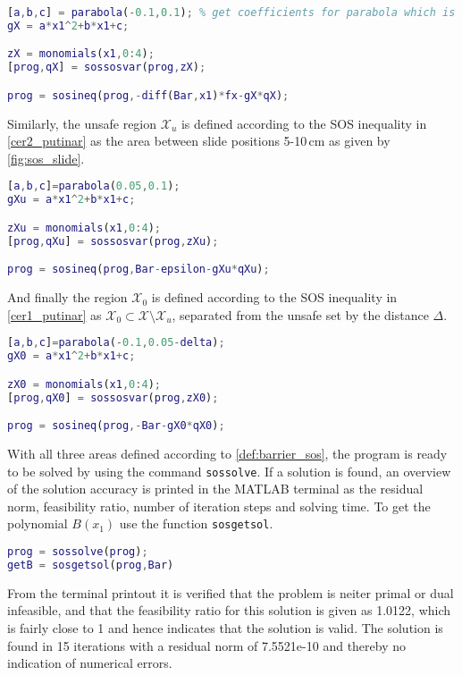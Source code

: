\begin{lstlisting}[language=matlab]
% Define space X in Rn
[a,b,c] = parabola(-0.1,0.1); % get coefficients for parabola which is positive for x in [-0.1,0.1] m
gX = a*x1^2+b*x1+c;

zX = monomials(x1,0:4);
[prog,qX] = sossosvar(prog,zX);

prog = sosineq(prog,-diff(Bar,x1)*fx-gX*qX);
\end{lstlisting}
Similarly, the unsafe region $\mathcal{X}_u$ is defined according to the SOS inequality in \autoref{cer2_putinar} as the area between slide positions 5-10\,cm as given by \autoref{fig:sos_slide}.
\begin{lstlisting}[language=matlab]
% Define space Xu in X
[a,b,c]=parabola(0.05,0.1);
gXu = a*x1^2+b*x1+c;

zXu = monomials(x1,0:4);
[prog,qXu] = sossosvar(prog,zXu);

prog = sosineq(prog,Bar-epsilon-gXu*qXu);
\end{lstlisting}
And finally the region $\mathcal{X}_0$ is defined according to the SOS inequality in \autoref{cer1_putinar} as $\mathcal{X}_0\subset\mathcal{X}\setminus\mathcal{X}_u$, separated from the unsafe set by the distance $\Delta$.
\begin{lstlisting}[language=matlab]
% Define space X0 in X
[a,b,c]=parabola(-0.1,0.05-delta);
gX0 = a*x1^2+b*x1+c;

zX0 = monomials(x1,0:4);
[prog,qX0] = sossosvar(prog,zX0);

prog = sosineq(prog,-Bar-gX0*qX0);
\end{lstlisting}
With all three areas defined according to \autoref{def:barrier_sos}, the program is ready to be solved by using the command \texttt{sossolve}. If a solution is found, an overview of the solution accuracy is printed in the MATLAB terminal as the residual norm, feasibility ratio, number of iteration steps and solving time. To get the polynomial $B(x_1)$ use the function \texttt{sosgetsol}.
\begin{lstlisting}[language=matlab]
% Solve for barrier certificate
prog = sossolve(prog);
getB = sosgetsol(prog,Bar)
\end{lstlisting}

\vspace{-2mm}
From the terminal printout it is verified that the problem is neiter primal or dual infeasible, and that the feasibility ratio for this solution is given as 1.0122, which is fairly close to 1 and hence indicates that the solution is valid. The solution is found in 15 iterations with a residual norm of 7.5521e-10 and thereby no indication of numerical errors.

